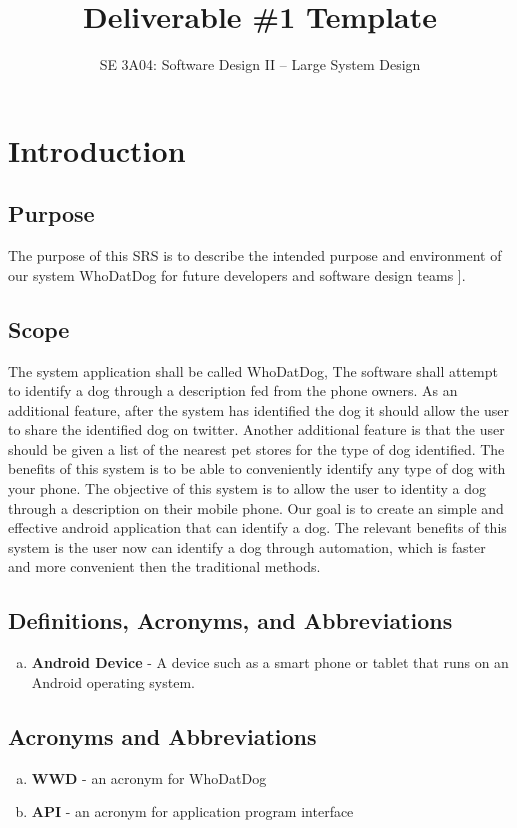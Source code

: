 \documentclass[]{article}
\title{Deliverable \#1 Template}
\author{SE 3A04: Software Design II -- Large System Design}
\date{}
\begin{document}
\maketitle	

\section{Introduction}
\label{sec:introduction}
\subsection{Purpose}

The purpose of this SRS is to describe the intended purpose and environment of our system WhoDatDog for future developers and software design teams
]. 


\subsection{Scope}
\label{sub:scope}
The system application shall be called WhoDatDog, The software shall attempt to identify a dog through a description fed from the phone owners. As an additional feature, after the system has identified the dog it should allow the user to share the identified dog on twitter. Another additional feature is that the user should be given a list of the nearest pet stores for the type of dog identified. The benefits of this system is to be able to conveniently identify any type of dog with your phone. The objective of this system is to allow the user to identity a dog through a description on their mobile phone. Our goal is to create an simple and effective android application that can identify a dog. The relevant benefits of this system is the user now can identify a dog through automation, which is faster and more convenient then the traditional methods.   

\subsection{Definitions, Acronyms, and Abbreviations}
\label{sub:definitions_acronyms_and_abbreviations}
\begin{enumerate}[a)]
	\item \textbf{Android Device} - A device such as a smart phone or tablet that runs on an Android operating system.
\end{enumerate}

\subsection{Acronyms and Abbreviations}
\begin{enumerate}[a)]
	\item \textbf{WWD} - an acronym for WhoDatDog
	\item \textbf{API} - an acronym for application program interface
\end{enumerate}
\end{document}
